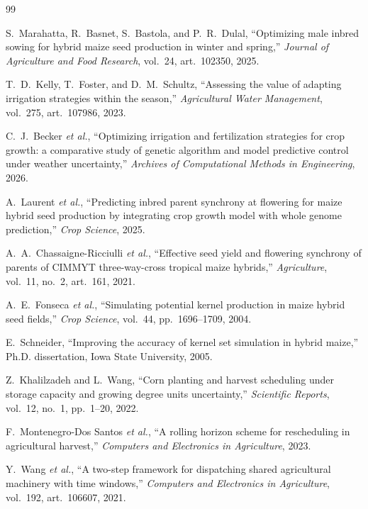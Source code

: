 \documentclass[10pt,twocolumn]{article}
\begin{document}
\balance
\begin{thebibliography}{99}
\footnotesize

S.~Marahatta, R.~Basnet, S.~Bastola, and P.~R.~Dulal,
``Optimizing male inbred sowing for hybrid maize seed production in winter and
spring,'' \textit{Journal of Agriculture and Food Research}, vol.~24,
art.~102350, 2025.

T.~D.~Kelly, T.~Foster, and D.~M.~Schultz,
``Assessing the value of adapting irrigation strategies within the season,''
\textit{Agricultural Water Management}, vol.~275, art.~107986, 2023.

C.~J.~Becker \textit{et al.},
``Optimizing irrigation and fertilization strategies for crop growth: a
comparative study of genetic algorithm and model predictive control under
weather uncertainty,'' \textit{Archives of Computational Methods in
Engineering}, 2026.

A.~Laurent \textit{et al.},
``Predicting inbred parent synchrony at flowering for maize hybrid seed
production by integrating crop growth model with whole genome prediction,''
\textit{Crop Science}, 2025.

A.~A.~Chassaigne-Ricciulli \textit{et al.},
``Effective seed yield and flowering synchrony of parents of CIMMYT
three-way-cross tropical maize hybrids,'' \textit{Agriculture}, vol.~11,
no.~2, art.~161, 2021.

A.~E.~Fonseca \textit{et al.},
``Simulating potential kernel production in maize hybrid seed fields,''
\textit{Crop Science}, vol.~44, pp.~1696--1709, 2004.

E.~Schneider,
``Improving the accuracy of kernel set simulation in hybrid maize,''
Ph.D. dissertation, Iowa State University, 2005.

Z.~Khalilzadeh and L.~Wang,
``Corn planting and harvest scheduling under storage capacity and growing
degree units uncertainty,'' \textit{Scientific Reports}, vol.~12, no.~1,
pp.~1--20, 2022.

F.~Montenegro-Dos Santos \textit{et al.},
``A rolling horizon scheme for rescheduling in agricultural harvest,''
\textit{Computers and Electronics in Agriculture}, 2023.

Y.~Wang \textit{et al.},
``A two-step framework for dispatching shared agricultural machinery with
time windows,'' \textit{Computers and Electronics in Agriculture}, vol.~192,
art.~106607, 2021.


\end{thebibliography}
\end{document}
